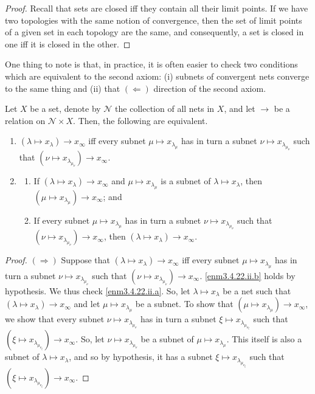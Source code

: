 \begin{thm}
\begin{proof}
Recall that sets are closed iff they contain all their limit points.  If we have two topologies with the same notion of convergence, then the set of limit points of a given set in each topology are the same, and consequently, a set is closed in one iff it is closed in the other.
\end{proof}
\end{thm}
One thing to note is that, in practice, it is often easier to check two conditions which are equivalent to the second axiom:   (i) subnets of convergent nets converge to the same thing and (ii) that $(\Leftarrow )$ direction of the second axiom.
\begin{prp}\label{prp3.4.22}
Let $X$ be a set, denote by $\mathcal{N}$ the collection of all nets in $X$, and let $\to$ be a relation on $\mathcal{N}\times X$.  Then, the following are equivalent.
\begin{enumerate}
\item \label{enm3.4.22.i}$(\lambda \mapsto x_\lambda )\to x_\infty$ iff every subnet $\mu \mapsto x_{\lambda _\mu}$ has in turn a subnet $\nu \mapsto x_{\lambda _{\mu _\nu}}$ such that $(\nu \mapsto x_{\lambda _{\mu _\nu}})\to x_\infty$.
\item \label{enm3.4.22.ii}\begin{enumerate}
\item \label{enm3.4.22.ii.a}If $(\lambda \mapsto x_\lambda )\to x_\infty$ and $\mu \mapsto x_{\lambda _\mu}$ is a subnet of $\lambda \mapsto x_\lambda$, then $(\mu \mapsto x_{\lambda _\mu})\to x_\infty$; and
\item \label{enm3.4.22.ii.b}If every subnet $\mu \mapsto x_{\lambda _\mu}$ has in turn a subnet $\nu \mapsto x_{\lambda _{\mu _\nu}}$ such that $(\nu \mapsto x_{\lambda _{\mu _\nu}})\to x_\infty$, then $(\lambda \mapsto x_\lambda )\to x_\infty$.
\end{enumerate}
\end{enumerate}
\begin{proof}
$(\Rightarrow )$ Suppose that $(\lambda \mapsto x_\lambda )\to x_\infty$ iff every subnet $\mu \mapsto x_{\lambda _\mu}$ has in turn a subnet $\nu \mapsto x_{\lambda _{\mu _\nu}}$ such that $(\nu \mapsto x_{\lambda _{\mu _\nu}})\to x_\infty$.  \ref{enm3.4.22.ii.b} holds by hypothesis.  We thus check \ref{enm3.4.22.ii.a}.  So, let $\lambda \mapsto x_\lambda$ be a net such that $(\lambda \mapsto x_\lambda )\to x_\infty$ and let $\mu \mapsto x_{\lambda _\mu}$ be a subnet.  To show that $(\mu \mapsto x_{\lambda _\mu})\to x_\infty$, we show that every subnet $\nu \mapsto x_{\lambda _{\mu _\nu}}$ has in turn a subnet $\xi \mapsto x_{\lambda _{\mu _{\nu _\xi}}}$ such that $(\xi \mapsto x_{\lambda _{\mu _{\nu _\xi}}})\to x_\infty$.  So, let $\nu \mapsto x_{\lambda _{\mu _\nu}}$ be a subnet of $\mu \mapsto x_{\lambda _\mu}$.  This itself is also a subnet of $\lambda \mapsto x_\lambda$, and so by hypothesis, it has a subnet $\xi \mapsto x_{\lambda _{\mu _{\nu _\xi}}}$ such that $(\xi \mapsto x_{\lambda _{\mu _{\nu _\xi}}})\to x_\infty$.


\end{proof}
\end{prp}
